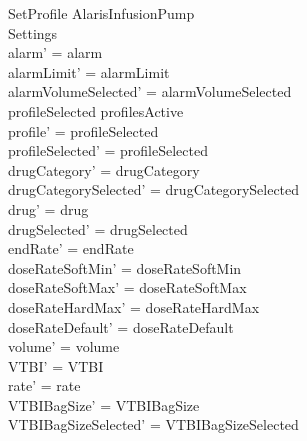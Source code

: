 \begin{schema}{SetProfile}
	\Delta AlarisInfusionPump\\
	 Settings\\
	\where
	alarm' = alarm\\
	alarmLimit' = alarmLimit\\
	alarmVolumeSelected' = alarmVolumeSelected\\
	profileSelected \in profilesActive\\
	profile' = profileSelected\\
	profileSelected' = profileSelected\\
	drugCategory' = drugCategory\\ 
	drugCategorySelected' = drugCategorySelected\\
	\pagebreak
	drug' = drug\\ 
	drugSelected' = drugSelected\\
	endRate' = endRate\\
	doseRateSoftMin' = doseRateSoftMin\\
	doseRateSoftMax' = doseRateSoftMax\\
	doseRateHardMax' = doseRateHardMax\\
	doseRateDefault' = doseRateDefault\\
	volume' = volume\\
	VTBI' = VTBI\\
	rate' = rate\\
	VTBIBagSize' = VTBIBagSize\\ 
	VTBIBagSizeSelected' = VTBIBagSizeSelected\\

\end{schema}
